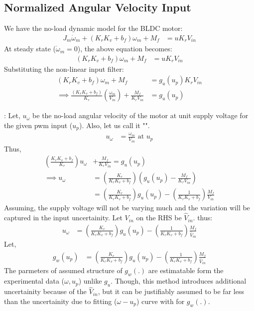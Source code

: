 \subsection{Normalized Angular Velocity Input}

We have the no-load dynamic model for the BLDC motor:
\begin{align*}
    J_m \dot \omega_m + (K_r K_v  + b_f) \omega_m + M_f &= u K_r V_{in}
\end{align*}
At steady state ($\dot \omega_m = 0$), the above equation becomes:
\begin{align*}
    (K_r K_v  + b_f) \omega_m + M_f &= u K_r V_{in}
\end{align*}
Substituting the non-linear input filter:
\begin{align*}
    (K_r K_v  + b_f) \omega_m + M_f &= g_u(u_p) K_r V_{in}\\
    \implies \frac{(K_r K_v  + b_f)}{K_r} \left(\frac{\omega_m}{V_{in}}\right) + \frac{M_f}{K_r V_{in}} &= g_u(u_p)
\end{align*}

: Let, $u_{\omega}$ be the no-load angular velocity of the motor at unit supply voltage for the given pwm input ($u_p$). Also, let us call it "".
\begin{align*}
    u_{\omega} &= \frac{\omega_m}{V_{in}} \text{  at  } u_p
\end{align*}
Thus,
\begin{align*}
    \left(\frac{K_r K_v  + b_f}{K_r} \right) u_{\omega} &+ \frac{M_f}{K_r V_{in}} = g_u(u_p)\\
    \implies u_{\omega} &= \left(\frac{K_r}{K_r K_v  + b_f} \right) \left( g_u(u_p) - \frac{M_f}{K_r V_{in}} \right)\\
    &= \left(\frac{K_r}{K_r K_v  + b_f} \right) g_u(u_p) - \left(\frac{1}{K_r K_v  + b_f} \right) \frac{M_f}{V_{in}}
\end{align*}
Assuming, the supply voltage will not be varying much and the variation will be captured in the input uncertainity. Let $V_{in}$ on the RHS be $\hat V_{in}$. thus:
\begin{align*}
    u_{\omega} &= \left(\frac{K_r}{K_r K_v  + b_f} \right) g_u(u_p) - \left(\frac{1}{K_r K_v  + b_f} \right) \frac{M_f}{\hat V_{in}}
\end{align*}
Let,
\begin{align*}
    g_w (u_p) &= \left(\frac{K_r}{K_r K_v  + b_f} \right) g_u(u_p) - \left(\frac{1}{K_r K_v  + b_f} \right) \frac{M_f}{\hat V_{in}}
\end{align*}
The parmeters of assumed structure of $g_w(.)$ are estimatable form the experimental data ($\omega, u_p$) unlike $g_u$. Though, this method introduces additional uncertainity because of the $\hat V_{in}$, but it can be justifiably assumed to be far less than the uncertainity due to fitting ($\omega-u_p$) curve with for $g_w(.)$.

